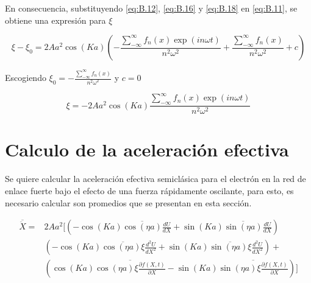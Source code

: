 En consecuencia, substituyendo \ref{eq:B.12}, \ref{eq:B.16} y \ref{eq:B.18} en \ref{eq:B.11}, se obtiene una expresión para $\xi$ 

    \begin{equation}\label{eq:B.19}
        \xi-\xi_0=2Aa^2\cos(Ka)(-\frac{\sum_{-\infty}^{\infty} f_n(x)\exp(i n\omega t)}{n^2\omega^2}+\frac{\sum_{-\infty}^{\infty} f_n(x)}{n^2\omega^2}+c)
    \end{equation}

Escogiendo $\xi_0=-\frac{\sum_{-\infty}^{\infty} f_n(x)}{n^2\omega^2}$ y $c=0$

    \begin{equation}\label{eq:B:20}
            \xi=-2Aa^2\cos(Ka)\frac{\sum_{-\infty}^{\infty} f_n(x)\exp(i n\omega t)}{n^2\omega^2}
    \end{equation}

\section{Calculo de la aceleración efectiva }\label{apendice:B.4}
Se quiere calcular la aceleración efectiva semiclásica para el electrón en la red de enlace fuerte bajo el efecto de una fuerza rápidamente oscilante, para esto, es necesario calcular son promedios que se presentan en esta sección. 

\begin{equation}\label{eq:B.21}
    \begin{split}
        \overline{\ddot{X}}=& 2Aa^2[(-\cos(Ka)\overline{\cos(\eta a)}\frac{dU}{dX}+\sin(Ka)\overline{\sin(\eta a)}\frac{dU}{dX})\\&
        (-\cos(Ka)\overline{\cos(\eta a)\xi}\frac{d^2U}{dX^2}+\sin(Ka)\overline{\sin(\eta a)\xi}\frac{d^2U}{dX^2})+ \\ &
        (\cos(Ka)\overline{\cos(\eta a)\xi \frac{\partial f(X,t)}{\partial X}}-\sin(Ka)\overline{\sin(\eta a)\xi \frac{\partial f(X,t)}{\partial X}})]  
     \end{split}
\end{equation}


